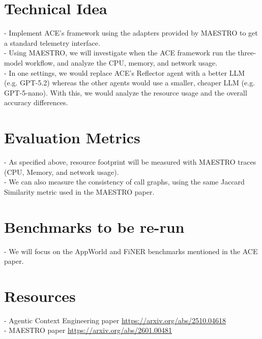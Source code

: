 \documentclass{article}
\begin{document}
\section{Technical Idea}

- Implement ACE's framework using the adapters provided by MAESTRO to get a standard telemetry interface.
\\
- Using MAESTRO, we will investigate when the ACE framework run the three-model workflow, and analyze the CPU, memory, and network usage.
\\
- In one settings, we would replace ACE's Reflector agent with a better LLM (e.g. GPT-5.2) whereas the other agents would use a smaller, cheaper LLM (e.g. GPT-5-nano). With this, we would analyze the resource usage and the overall accuracy differences.

\section{Evaluation Metrics}

- As specified above, resource footprint will be measured with MAESTRO traces (CPU, Memory, and network usage).
\\
- We can also measure the consistency of call graphs, using the same Jaccard Similarity metric used in the MAESTRO paper.

\section{Benchmarks to be re-run}

- We will focus on the AppWorld and FiNER benchmarks mentioned in the ACE paper.

\section{Resources}

- Agentic Context Engineering paper \url{https://arxiv.org/abs/2510.04618}
\\
- MAESTRO paper \url{https://arxiv.org/abs/2601.00481}
\end{document}
